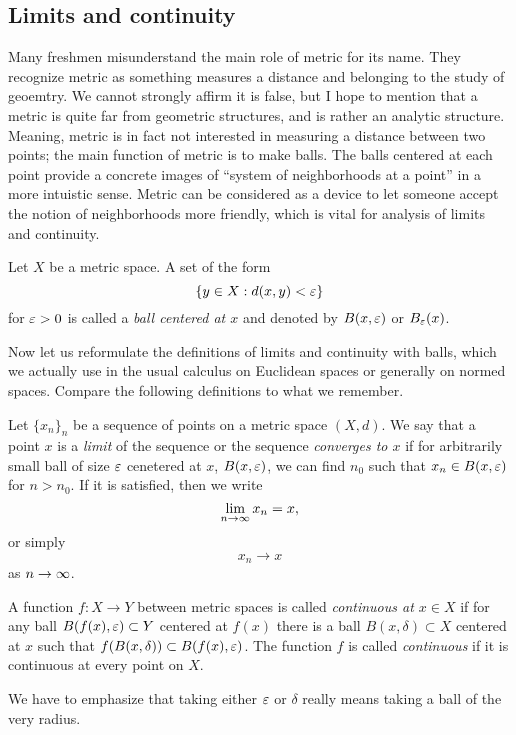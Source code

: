 \documentclass{../crs}
\begin{document}
\subsection{Limits and continuity}

Many freshmen misunderstand the main role of metric for its name.
They recognize metric as something measures a distance and belonging to the study of geoemtry.
We cannot strongly affirm it is false, but I hope to mention that a metric is quite far from geometric structures, and is rather an analytic structure.
Meaning, metric is in fact not interested in measuring a distance between two points; the main function of metric is to make balls.
The balls centered at each point provide a concrete images of ``system of neighborhoods at a point'' in a more intuistic sense.
Metric can be considered as a device to let someone accept the notion of neighborhoods more friendly, which is vital for analysis of limits and continuity.

\begin{defn}
Let $X$ be a metric space.
A set of the form 
\[\{y\in X:d(x,y)<\varepsilon\}\]
for $\varepsilon>0$ is called a \emph{ball centered at $x$} and denoted by $B(x,\varepsilon)$ or $B_\varepsilon(x)$.
\end{defn}

Now let us reformulate the definitions of limits and continuity with balls, which we actually use in the usual calculus on Euclidean spaces or generally on normed spaces.
Compare the following definitions to what we remember.

\begin{defn}
Let $\{x_n\}_n$ be a sequence of points on a metric space $(X,d)$.
We say that a point $x$ is a \emph{limit} of the sequence or the sequence \emph{converges to $x$} if for arbitrarily small ball of size $\varepsilon$ cenetered at $x$, $B(x,\varepsilon)$, we can find $n_0$ such that $x_n\in B(x,\varepsilon)$ for $n>n_0$.
If it is satisfied, then we write
\[\lim_{n\to\oo}x_n=x,\]
or simply
\[x_n\to x\]
as $n\to\oo$.
\end{defn}
\begin{defn}
A function $f:X\to Y$ between metric spaces is called \emph{continuous at $x\in X$} if for any ball $B(f(x),\varepsilon)\subset Y$ centered at $f(x)$ there is a ball $B(x,\delta)\subset X$ centered at $x$ such that $f(B(x,\delta))\subset B(f(x),\varepsilon)$.
The function $f$ is called \emph{continuous} if it is continuous at every point on $X$.
\end{defn}

We have to emphasize that taking either $\varepsilon$ or $\delta$ really means taking a ball of the very radius.
\end{document}
